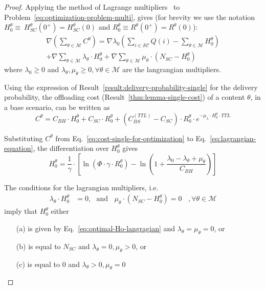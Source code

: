 \documentclass[10pt,conference,letterpaper]{IEEEtran}
\newcommand{\eq}[1]{Eq.~\eqref{#1}}
\begin{document}
\begin{proof}
Applying the method of Lagrange multipliers~\cite{practical-optimization-book} to Problem~\ref{eq:optimization-problem-multi}, gives (for brevity we use the notation $H_{0}^{\theta}\equiv~H_{SC}^{\theta}(0^{+})=H_{SC}^{\theta}(0)$ and $R_{0}^{\theta}\equiv R^{\theta}(0^{+})=R^{\theta}(0)$):
\begin{multline}\label{eq:lagrangian-equation}
 \nabla \left(\sum_{\theta\in\mathcal{M}} C^{\theta}\right) = 
	\nabla \lambda_{0} \left(\sum_{i\in\mathcal{SC}} Q(i)-\sum_{\theta\in\mathcal{M}} H_{0}^{\theta}\right)\\
	+ \nabla \sum_{\theta\in\mathcal{M}}\lambda_{\theta} \cdot H_{0}^{\theta} +\nabla \sum_{\theta\in\mathcal{M}}\mu_{\theta}\cdot(N_{SC}-H_{0}^{\theta})
\end{multline}
where $\lambda_{0}\geq0$ and $\lambda_{\theta},\mu_{\theta}\geq0,\forall\theta\in\mathcal{M}$ are the langrangian multipliers.

Using the expression of Result~\ref{result:delivery-probability-single} for the delivery probability, the offloading cost (Result~\ref{thm:lemma-single-cost}) of a content $\theta$, in a base scenario, can be written as
\begin{equation}\label{eq:cost-single-for-optimization}
C^{\theta} = C_{BH}\cdot H_{0}^{\theta} + C_{SC}\cdot R_{0}^{\theta}+(C_{BS}^{(TTL)}-C_{SC})\cdot R_{0}^{\theta}\cdot e^{-\mu_{\lambda}\cdot H_{0}^{\theta} \cdot TTL}
\end{equation}

Substituting $C^{\theta}$ from \eq{eq:cost-single-for-optimization} to \eq{eq:lagrangian-equation}, the differentiation over $H_{0}^{\theta}$ gives
\begin{equation}\label{eq:optimal-Ho-langragian}
 H_{0}^{\theta} = \frac{1}{\gamma}\cdot \left[\ln\left(\Phi\cdot \gamma\cdot R_{0}^{\theta}\right)-\ln\left(1+\frac{\lambda_{0}-\lambda_{\theta}+\mu_{\theta}}{C_{BH}}\right)\right]
\end{equation}

\noindent The conditions for the lagrangian multipliers, i.e.
\begin{align*}
\lambda_{\theta} \cdot H_{0}^{\theta}&=0,~~~\text{and}~~~~\mu_{\theta}\cdot(N_{SC}-H_{0}^{\theta})=0~~~~,\forall\theta\in\mathcal{M}
\end{align*}
imply that $H_{0}^{\theta}$ either 
\begin{itemize}
\item[(a)] is given by \eq{eq:optimal-Ho-langragian} and $\lambda_{\theta}=\mu_{\theta}=0$, or
\item[(b)] is equal to $N_{SC}$ and $\lambda_{\theta}=0, \mu_{\theta}>0$, or 
\item[(c)] is equal to $0$ and $\lambda_{\theta}>0, \mu_{\theta}=0$ 
\end{itemize}


\end{proof}
\end{document}
